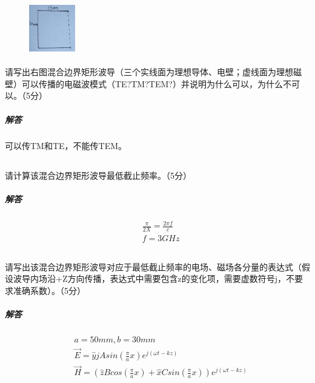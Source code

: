 \documentclass[UTF8]{ctexart}
\begin{document}
\subsection{}
\begin{figure}
\includegraphics[width=2cm]{2015-3.jpg}
\end{figure}
\paragraph{}
请写出右图混合边界矩形波导（三个实线面为理想导体、电壁；虚线面为理想磁壁）可以传播的电磁波模式（TE?TM?TEM?）并说明为什么可以，为什么不可以。（5分）
\subparagraph{解答}
可以传TM和TE，不能传TEM。
\subsection{}
\paragraph{}
请计算该混合边界矩形波导最低截止频率。（5分）
\subparagraph{解答}
\begin{equation*}
\begin{aligned}
&\frac{\pi}{2X}=\frac{2\pi f}{c}\\
&f=3GHz
\end{aligned}
\end{equation*}
\subsection{}
\paragraph{}
请写出该混合边界矩形波导对应于最低截止频率的电场、磁场各分量的表达式（假设波导内场沿+Z方向传播，表达式中需要包含z的变化项，需要虚数符号j，不要求准确系数）。（5分）
\subparagraph{解答}
\begin{equation*}
\begin{aligned}
&a=50mm, b=30mm\\
&\vec E=\hat yjAsin(\frac{\pi}{a}x)e^{j(\omega t-kz)}\\
&\vec H=(\hat zBcos(\frac{\pi}{a}x)+\hat xCsin(\frac{\pi}{a}x))e^{j(\omega t-kz)}
\end{aligned}
\end{equation*}
\end{document}
